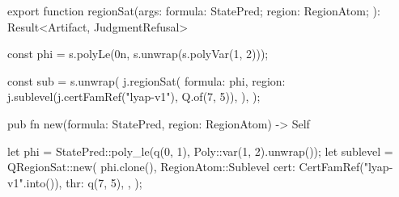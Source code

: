\begin{tssrc}
export function regionSat(args: {
  formula: StatePred;
  region: RegionAtom;
}): Result<Artifact, JudgmentRefusal>
\end{tssrc}
\begin{tssrc}
const phi = s.polyLe(0n, s.unwrap(s.polyVar(1, 2)));

const sub = s.unwrap(
  j.regionSat({
    formula: phi,
    region: j.sublevel(j.certFamRef("lyap-v1"), Q.of(7, 5)),
  }),
);
\end{tssrc}
\begin{rustsrc}
pub fn new(formula: StatePred, region: RegionAtom) -> Self
\end{rustsrc}
\begin{rustsrc}
let phi = StatePred::poly_le(q(0, 1), Poly::var(1, 2).unwrap());
let sublevel = QRegionSat::new(
    phi.clone(),
    RegionAtom::Sublevel {
        cert: CertFamRef("lyap-v1".into()),
        thr: q(7, 5),
    },
);
\end{rustsrc}
